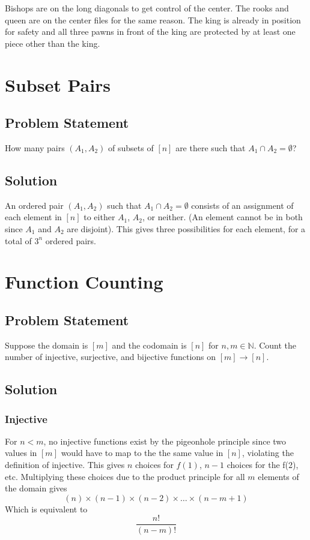 \documentclass[12pt]{article}
\begin{document}
    \begin{center}
    \showboard
    \end{center}
    
    Bishops are on the long diagonals to get control of the center. The rooks and queen are on the center files for the same reason. The king is already in  position for safety and all three pawns in front of the king are protected by at least one piece other than the king.
    
    

\section{Subset Pairs}
\subsection*{Problem Statement}
How many pairs $(A_1, A_2)$ of subsets of $[n]$ are there such that $A_1 \cap A_2 = \emptyset$?
\subsection*{Solution}
An ordered pair $(A_1, A_2)$ such that $A_1 \cap A_2 = \emptyset$ consists of an assignment of each element in $[n]$ to either $A_1$, $A_2$, or neither. (An element cannot be in both since $A_1$ and $A_2$ are disjoint). This gives three possibilities for each element, for a total of $3^n$ ordered pairs.

\section{Function Counting}
\subsection*{Problem Statement}
Suppose the domain is $[m]$ and the codomain is $[n]$ for $n,m \in \mathbb{N}$. Count the number of injective, surjective, and bijective functions on $[m] \rightarrow [n]$.
\subsection*{Solution}
\subsubsection*{Injective}

For $n < m$, no injective functions exist by the pigeonhole principle since two values in $[m]$ would have to  map to the the same value in $[n]$, violating the definition of injective. This gives $n$ choices for $f(1)$, $n-1$ choices for the f(2), etc. Multiplying these choices due to the product principle for all $m$ elements of the domain gives 
    $$(n) \times (n-1) \times (n-2) \times \ldots \times (n - m + 1)$$
    Which is equivalent to $$\frac{n!}{(n-m)!}$$
    
\end{document}
